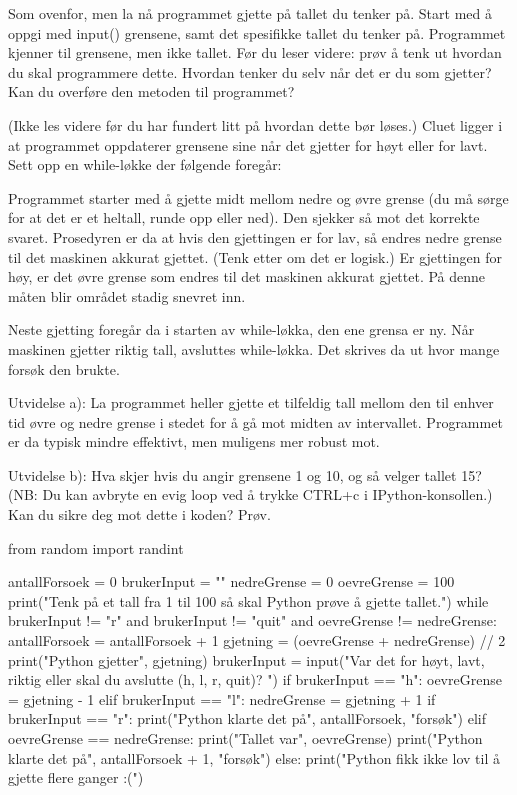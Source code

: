 \begin{exercise}
Som ovenfor, men la nå programmet gjette på tallet du tenker på.
Start med å oppgi med input() grensene, samt det spesifikke tallet du tenker på. Programmet kjenner til grensene, men ikke tallet. Før du leser videre: prøv å tenk ut hvordan du skal programmere dette. Hvordan tenker du selv når det er du som gjetter? Kan du overføre den metoden til programmet?

(Ikke les videre før du har fundert litt på hvordan dette bør løses.) Cluet ligger i at programmet oppdaterer grensene sine når det gjetter for høyt eller for lavt. Sett opp en while-løkke der følgende foregår: 

Programmet starter med å gjette midt mellom nedre og øvre grense
(du må sørge for at det er et heltall, runde opp eller ned).
Den sjekker så mot det korrekte svaret. Prosedyren er da at hvis den gjettingen er for lav, så endres nedre grense til det maskinen akkurat gjettet. (Tenk etter om det er logisk.) 
Er gjettingen for høy, er det øvre grense som endres til det maskinen akkurat gjettet.
På denne måten blir området stadig snevret inn.

Neste gjetting foregår da i starten av while-løkka, den ene grensa er ny. Når maskinen gjetter riktig tall, avsluttes while-løkka. Det skrives da ut hvor mange forsøk den brukte. 

Utvidelse a): La programmet heller gjette et tilfeldig tall mellom den til enhver tid øvre og nedre grense i stedet for å gå mot midten av intervallet. Programmet er da typisk mindre effektivt, men muligens mer robust mot.

Utvidelse b): Hva skjer hvis du angir grensene 1 og 10, og så velger tallet 15? (NB: Du kan avbryte en evig loop ved å trykke CTRL+c i IPython-konsollen.) Kan du sikre deg mot dette i koden? Prøv. 
\end{exercise}
\begin{solution}
\begin{usncodebox}
from random import randint

antallForsoek = 0
brukerInput = ""
nedreGrense = 0
oevreGrense = 100
print("Tenk på et tall fra 1 til 100 så skal Python prøve å gjette tallet.")
while brukerInput != "r" and brukerInput != "quit" and oevreGrense != nedreGrense:
    antallForsoek = antallForsoek + 1
    gjetning = (oevreGrense + nedreGrense) // 2
    print("Python gjetter", gjetning)
    brukerInput = input("Var det for høyt, lavt, riktig eller skal du avslutte (h, l, r, quit)? ")
    if brukerInput == "h":
        oevreGrense = gjetning - 1
    elif brukerInput == "l":
        nedreGrense = gjetning + 1
if brukerInput == "r":
    print("Python klarte det på", antallForsoek, "forsøk")
elif oevreGrense == nedreGrense:
    print("Tallet var", oevreGrense)
    print("Python klarte det på", antallForsoek + 1, "forsøk")
else:
    print("Python fikk ikke lov til å gjette flere ganger :(")
\end{usncodebox}
\end{solution}

